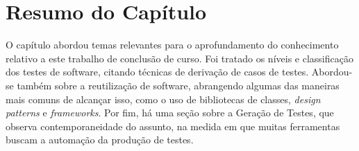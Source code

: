 \section{Resumo do Capítulo}
O capítulo abordou temas relevantes para o aprofundamento do conhecimento
relativo a este trabalho de conclusão de curso. Foi tratado os níveis e classificação dos testes de software, citando técnicas de derivação de casos de testes. Abordou-se também sobre a reutilização de software, abrangendo
algumas das maneiras mais comuns de alcançar isso, como o uso de bibliotecas de
classes, \textit{design patterns} e \textit{frameworks}. Por fim, há uma seção sobre
a Geração de Testes, que observa contemporaneidade do assunto, na medida em que
muitas ferramentas buscam a automação da produção de testes.
